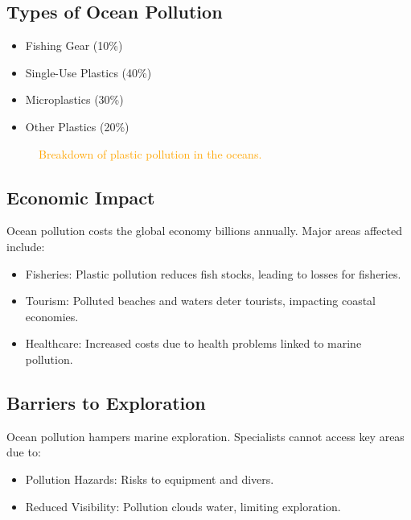 \subsection{Types of Ocean Pollution}

\begin{itemize}
    \item Fishing Gear (10\%)
    \item Single-Use Plastics (40\%)
    \item Microplastics (30\%)
    \item Other Plastics (20\%)
\end{itemize}

\begin{figure}[h!]
    \centering
    \caption{\textcolor{orange}{Breakdown of plastic pollution in the oceans.}}
\end{figure}

\subsection{Economic Impact}

Ocean pollution costs the global economy billions annually. Major areas affected include:
\begin{itemize}
    \item Fisheries: Plastic pollution reduces fish stocks, leading to losses for fisheries.
    \item Tourism: Polluted beaches and waters deter tourists, impacting coastal economies.
    \item Healthcare: Increased costs due to health problems linked to marine pollution.
\end{itemize}


\subsection{Barriers to Exploration}

Ocean pollution hampers marine exploration. Specialists cannot access key areas due to:
\begin{itemize}
    \item Pollution Hazards: Risks to equipment and divers.
    \item Reduced Visibility: Pollution clouds water, limiting exploration.
\end{itemize}

